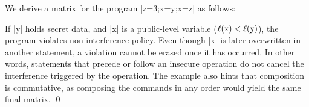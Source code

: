 \begin{example}
We derive a matrix for the program \prc|z=3;x=y;x=z| as follows:

\begin{center}\end{center}
%
If \prc|y| holds secret data, and \prc|x| is a public-level variable (\ie \(\ell(\mathtt{x}) < \ell(\mathtt{y})\)), the program violates non-interference policy.
Even though \prc|x| is later overwritten in another statement, a violation cannot be erased once it has occurred.
In other words, statements that precede or follow an insecure operation do not cancel the interference triggered by the operation.
The example also hints that composition is commutative, as composing the commands in any order would yield the same final matrix.
\qed
\end{example}


